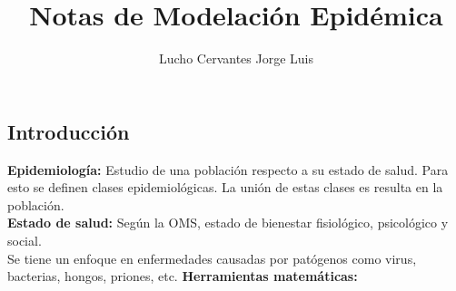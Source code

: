 \documentclass[10pt,oneside]{article}
\title{\textbf{Notas de Modelación Epidémica}}
\author{Lucho Cervantes Jorge Luis}
\theoremstyle{definition}
\begin{document}
\maketitle

\begin{multicols}{2}

\tableofcontents
    \section{Introducción}
    
    \textbf{Epidemiología:} Estudio de una población respecto a su estado de salud. Para esto se definen clases epidemiológicas. La unión de estas clases es resulta en la población. \\ \newline \textbf{Estado de salud:} Según la OMS, estado de bienestar fisiológico, psicológico y social. \\ \newline Se tiene un enfoque en enfermedades causadas por patógenos como virus, bacterias, hongos, priones, etc.
    \textbf{Herramientas matemáticas:}
    

\end{multicols}
\end{document}
